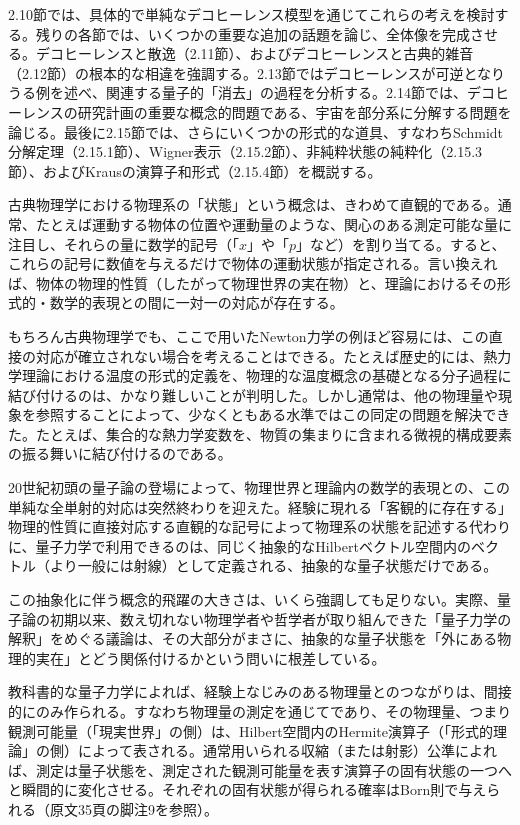 2.10節では、具体的で単純なデコヒーレンス模型を通じてこれらの考えを検討する。残りの各節では、いくつかの重要な追加の話題を論じ、全体像を完成させる。デコヒーレンスと散逸（2.11節）、およびデコヒーレンスと古典的雑音（2.12節）の根本的な相違を強調する。2.13節ではデコヒーレンスが可逆となりうる例を述べ、関連する量子的「消去」の過程を分析する。2.14節では、デコヒーレンスの研究計画の重要な概念的問題である、宇宙を部分系に分解する問題を論じる。最後に2.15節では、さらにいくつかの形式的な道具、すなわちSchmidt分解定理（2.15.1節）、Wigner表示（2.15.2節）、非純粋状態の純粋化（2.15.3節）、およびKrausの演算子和形式（2.15.4節）を概説する。

古典物理学における物理系の「状態」という概念は、きわめて直観的である。通常、たとえば運動する物体の位置や運動量のような、関心のある測定可能な量に注目し、それらの量に数学的記号（「$x$」や「$p$」など）を割り当てる。すると、これらの記号に数値を与えるだけで物体の運動状態が指定される。言い換えれば、物体の物理的性質（したがって物理世界の実在物）と、理論におけるその形式的・数学的表現との間に一対一の対応が存在する。

\hypertarget{srcpage:15}{}\label{srcpage:15}
もちろん古典物理学でも、ここで用いたNewton力学の例ほど容易には、この直接の対応が確立されない場合を考えることはできる。たとえば歴史的には、熱力学理論における温度の形式的定義を、物理的な温度概念の基礎となる分子過程に結び付けるのは、かなり難しいことが判明した。しかし通常は、他の物理量や現象を参照することによって、少なくともある水準ではこの同定の問題を解決できた。たとえば、集合的な熱力学変数を、物質の集まりに含まれる微視的構成要素の振る舞いに結び付けるのである。

20世紀初頭の量子論の登場によって、物理世界と理論内の数学的表現との、この単純な全単射的対応は突然終わりを迎えた。経験に現れる「客観的に存在する」物理的性質に直接対応する直観的な記号によって物理系の状態を記述する代わりに、量子力学で利用できるのは、同じく抽象的なHilbertベクトル空間内のベクトル（より一般には射線）として定義される、抽象的な量子状態だけである。

この抽象化に伴う概念的飛躍の大きさは、いくら強調しても足りない。実際、量子論の初期以来、数え切れない物理学者や哲学者が取り組んできた「量子力学の解釈」をめぐる議論は、その大部分がまさに、抽象的な量子状態を「外にある物理的実在」とどう関係付けるかという問いに根差している。

教科書的な量子力学によれば、経験上なじみのある物理量とのつながりは、間接的にのみ作られる。すなわち物理量の測定を通じてであり、その物理量、つまり観測可能量（「現実世界」の側）は、Hilbert空間内のHermite演算子（「形式的理論」の側）によって表される。通常用いられる収縮（または射影）公準によれば、測定は量子状態を、測定された観測可能量を表す演算子の固有状態の一つへと瞬間的に変化させる。それぞれの固有状態が得られる確率はBorn則\cite{ref019}で与えられる（原文35頁の脚注9を参照）。

